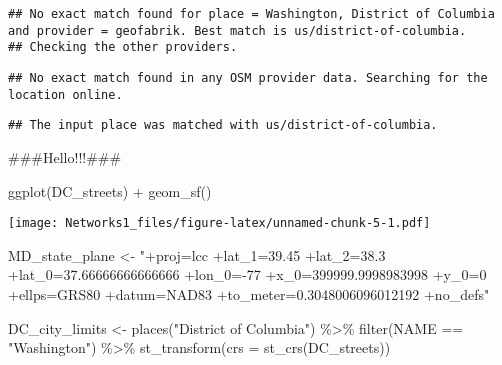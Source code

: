 \documentclass[
]{article}
\newenvironment{Shaded}{\begin{snugshade}}{\end{snugshade}}
\newcommand{\AttributeTok}[1]{\textcolor[rgb]{0.77,0.63,0.00}{#1}}
\newcommand{\ConstantTok}[1]{\textcolor[rgb]{0.00,0.00,0.00}{#1}}
\newcommand{\FunctionTok}[1]{\textcolor[rgb]{0.00,0.00,0.00}{#1}}
\newcommand{\NormalTok}[1]{#1}
\newcommand{\OtherTok}[1]{\textcolor[rgb]{0.56,0.35,0.01}{#1}}
\newcommand{\SpecialCharTok}[1]{\textcolor[rgb]{0.00,0.00,0.00}{#1}}
\newcommand{\StringTok}[1]{\textcolor[rgb]{0.31,0.60,0.02}{#1}}
\begin{document}
\begin{verbatim}
## No exact match found for place = Washington, District of Columbia and provider = geofabrik. Best match is us/district-of-columbia. 
## Checking the other providers.
\end{verbatim}

\begin{verbatim}
## No exact match found in any OSM provider data. Searching for the location online.
\end{verbatim}

\begin{verbatim}
## The input place was matched with us/district-of-columbia.
\end{verbatim}

\begin{Shaded}
\end{Shaded}

\#\#\#Hello!!!\#\#\#

\begin{Shaded}
\begin{Highlighting}[]
\FunctionTok{ggplot}\NormalTok{(DC\_streets) }\SpecialCharTok{+}
  \FunctionTok{geom\_sf}\NormalTok{()}
\end{Highlighting}
\end{Shaded}

\texttt{[image: Networks1\_files/figure-latex/unnamed-chunk-5-1.pdf]}

\begin{Shaded}
\begin{Highlighting}[]
\NormalTok{MD\_state\_plane }\OtherTok{\textless{}{-}} \StringTok{"+proj=lcc +lat\_1=39.45 +lat\_2=38.3 +lat\_0=37.66666666666666 +lon\_0={-}77 +x\_0=399999.9998983998 +y\_0=0 +ellps=GRS80 +datum=NAD83 +to\_meter=0.3048006096012192 +no\_defs"}

\NormalTok{DC\_city\_limits }\OtherTok{\textless{}{-}} \FunctionTok{places}\NormalTok{(}\StringTok{"District of Columbia"}\NormalTok{) }\SpecialCharTok{\%\textgreater{}\%}
  \FunctionTok{filter}\NormalTok{(NAME }\SpecialCharTok{==} \StringTok{"Washington"}\NormalTok{) }\SpecialCharTok{\%\textgreater{}\%}
  \FunctionTok{st\_transform}\NormalTok{(}\AttributeTok{crs =} \FunctionTok{st\_crs}\NormalTok{(DC\_streets))}
\end{Highlighting}
\end{Shaded}
\end{document}

